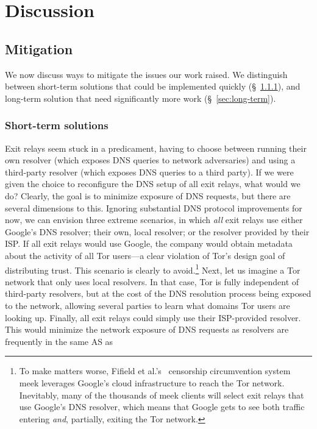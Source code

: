 \section{Discussion}
\label{sec:discussion}

\subsection{Mitigation}
We now discuss ways to mitigate the issues our work raised.  We distinguish
between short-term solutions that could be implemented quickly
(\S~\ref{sec:short-term}), and long-term solution that need significantly more
work (\S~\ref{sec:long-term}).

\subsubsection{Short-term solutions}
\label{sec:short-term}
Exit relays seem stuck in a predicament, having to choose between running their
own resolver (which exposes DNS queries to network adversaries) and using a
third-party resolver (which exposes DNS queries to a third party).  If we were
given the choice to reconfigure the DNS setup of all exit relays, what would we
do?  Clearly, the goal is to minimize exposure of DNS requests, but there are
several dimensions to this.  Ignoring substantial DNS protocol improvements for
now, we can envision three extreme scenarios, in which \emph{all} exit relays
use either \first Google's DNS resolver; \second their own, local resolver; or
\third the resolver provided by their ISP.  If all exit relays would use Google,
the company would obtain metadata about the activity of all Tor users---a clear
violation of Tor's design goal of distributing trust.  This scenario is clearly
to avoid.\footnote{To make matters worse, Fifield et al.'s~\cite{Fifield2015a}
censorship circumvention system meek leverages Google's cloud infrastructure
to reach the Tor network.  Inevitably, many of the thousands of meek clients
will select exit relays that use Google's DNS resolver, which means that Google
gets to see both traffic entering \emph{and}, partially, exiting the Tor
network.} Next, let us imagine a Tor network that only uses local resolvers.  In
that case, Tor is fully independent of third-party resolvers, but at the cost of
the DNS resolution process being exposed to the network, allowing several
parties to learn what domains Tor users are looking up.  Finally, all exit
relays could simply use their ISP-provided resolver.  This would minimize the
network exposure of DNS requests as resolvers are frequently in the same AS as
